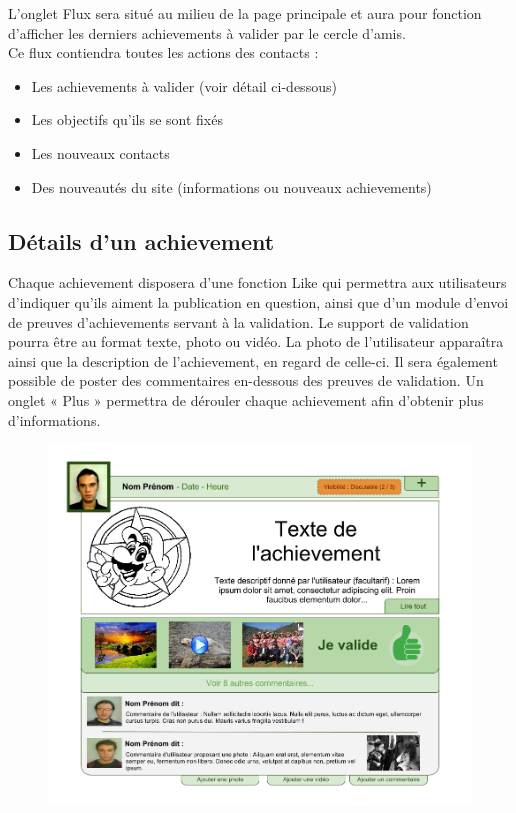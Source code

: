 \documentclass{life-fr}
\begin{document}
L'onglet Flux sera situé au milieu de la page principale et aura pour fonction d'afficher les derniers achievements à valider par le cercle d'amis.\\

Ce flux contiendra toutes les actions des contacts :

\begin{itemize}
  \item Les achievements à valider (voir détail ci-dessous)
  \item Les objectifs qu'ils se sont fixés
  \item Les nouveaux contacts
  \item Des nouveautés du site (informations ou nouveaux achievements)
\end{itemize}

\subsection{Détails d'un achievement}

Chaque achievement disposera d'une fonction Like qui permettra aux utilisateurs d'indiquer qu'ils aiment la publication en question, ainsi que d'un module d'envoi de preuves d'achievements servant à la validation. Le support de validation pourra être au format texte, photo ou vidéo. La photo de l'utilisateur apparaîtra ainsi que la description de l'achievement, en regard de celle-ci. Il sera également possible de poster des commentaires en-dessous des preuves de validation. Un onglet « Plus » permettra de dérouler chaque achievement afin d'obtenir plus d'informations.\\

\begin{figure}[H]
  \begin{center}
    \includegraphics[width=15cm]{img/achievement.png}
  \end{center}
\end{figure}
\end{document}
